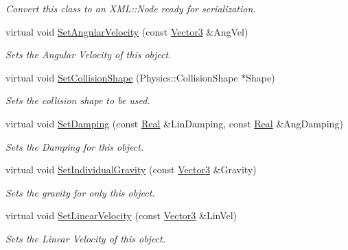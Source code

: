 \begin{DoxyCompactItemize}
\begin{DoxyCompactList}\small\item\em Convert this class to an X\-M\-L\-::\-Node ready for serialization. \end{DoxyCompactList}\item 
virtual void \hyperlink{classMezzanine_1_1ActorRigidPhysicsSettings_a0e5b8a968b6f41dfeebd0fcfc01c6458}{Set\-Angular\-Velocity} (const \hyperlink{classMezzanine_1_1Vector3}{Vector3} \&Ang\-Vel)
\begin{DoxyCompactList}\small\item\em Sets the Angular Velocity of this object. \end{DoxyCompactList}\item 
virtual void \hyperlink{classMezzanine_1_1ActorRigidPhysicsSettings_a2fb30c2b45bce6e8282a8ab36147cd52}{Set\-Collision\-Shape} (Physics\-::\-Collision\-Shape $\ast$Shape)
\begin{DoxyCompactList}\small\item\em Sets the collision shape to be used. \end{DoxyCompactList}\item 
virtual void \hyperlink{classMezzanine_1_1ActorRigidPhysicsSettings_a9342e7ff1f485ddf99930f24e081084a}{Set\-Damping} (const \hyperlink{namespaceMezzanine_a726731b1a7df72bf3583e4a97282c6f6}{Real} \&Lin\-Damping, const \hyperlink{namespaceMezzanine_a726731b1a7df72bf3583e4a97282c6f6}{Real} \&Ang\-Damping)
\begin{DoxyCompactList}\small\item\em Sets the Damping for this object. \end{DoxyCompactList}\item 
virtual void \hyperlink{classMezzanine_1_1ActorRigidPhysicsSettings_ad1280574ff86c008c46c10a7133ca274}{Set\-Individual\-Gravity} (const \hyperlink{classMezzanine_1_1Vector3}{Vector3} \&Gravity)
\begin{DoxyCompactList}\small\item\em Sets the gravity for only this object. \end{DoxyCompactList}\item 
virtual void \hyperlink{classMezzanine_1_1ActorRigidPhysicsSettings_a861a7cf22d838cbbe108cd7daad59e76}{Set\-Linear\-Velocity} (const \hyperlink{classMezzanine_1_1Vector3}{Vector3} \&Lin\-Vel)
\begin{DoxyCompactList}\small\item\em Sets the Linear Velocity of this object. \end{DoxyCompactList}\item 

\end{DoxyCompactItemize}
